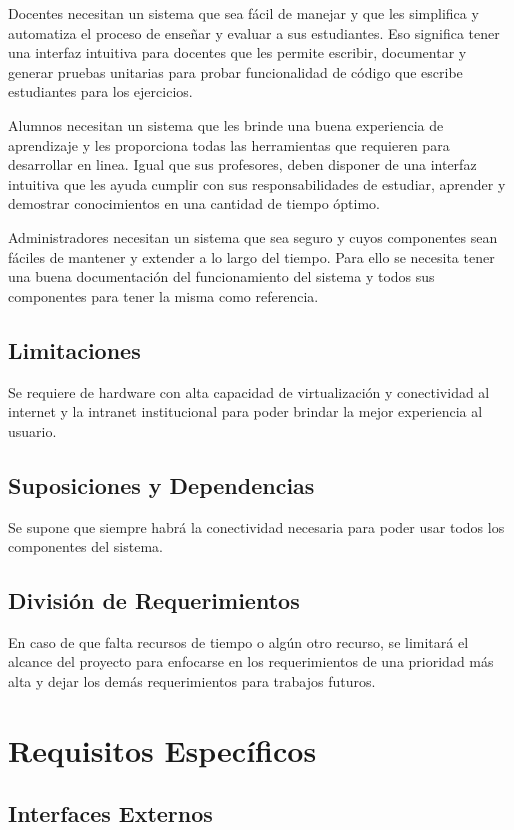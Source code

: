 Docentes necesitan un sistema que sea fácil de manejar y que les simplifica y automatiza el proceso de enseñar y evaluar a sus estudiantes. Eso significa tener una interfaz intuitiva para docentes que les permite escribir, documentar y generar pruebas unitarias para probar funcionalidad de código que escribe estudiantes para los ejercicios.

Alumnos necesitan un sistema que les brinde una buena experiencia de aprendizaje y les proporciona todas las herramientas que requieren para desarrollar en linea. Igual que sus profesores, deben disponer de una interfaz intuitiva que les ayuda cumplir con sus responsabilidades de estudiar, aprender y demostrar conocimientos en una cantidad de tiempo óptimo.

Administradores necesitan un sistema que sea seguro y cuyos componentes sean fáciles de mantener y extender a lo largo del tiempo. Para ello se necesita tener una buena documentación del funcionamiento del sistema y todos sus componentes para tener la misma como referencia.

\subsection{Limitaciones}
Se requiere de hardware con alta capacidad de virtualización y conectividad al internet y la intranet institucional para poder brindar la mejor experiencia al usuario.

\subsection{Suposiciones y Dependencias}
Se supone que siempre habrá la conectividad necesaria para poder usar todos los componentes del sistema.

\subsection{División de Requerimientos}
En caso de que falta recursos de tiempo o algún otro recurso, se limitará el alcance del proyecto para enfocarse en los requerimientos de una prioridad más alta y dejar los demás requerimientos para trabajos futuros.

\section{Requisitos Específicos}

\subsection{Interfaces Externos}

